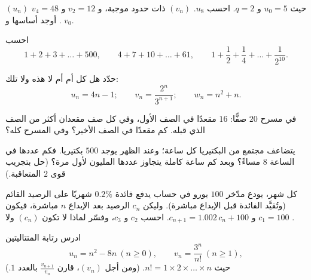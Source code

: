 \begin{exercise}[$\star$]\label{exo:g11:seq:3}
 $(u_n)$  حيث $u_0 = 5$ و $q = 2$. احسب $u_8$.  $(v_n)$
 ذات حدود موجبة، و $v_2 = 12$ و $v_4 = 48$. أوجد أساسها
و $v_0$.
\end{exercise}

\begin{exercise}[$\star$]\label{exo:g11:seq:4}
احسب
\[
1 + 2 + 3 + \dots + 500, \qquad
4 + 7 + 10 + \dots + 61, \qquad
1 + \frac12 + \frac14 + \dots + \frac{1}{2^{10}} .
\]
\end{exercise}

\begin{exercise}[$\star$]\label{exo:g11:seq:5}
حدّد هل كل  أم  أم لا هذه ولا تلك:
\[
u_n = 4n - 1; \qquad
v_n = \frac{2^n}{3^{n+1}}; \qquad
w_n = n^2 + n .
\]
\end{exercise}

\begin{exercise}[$\star\star$]\label{exo:g11:seq:6}
في مسرح $20$ صفًّا: $16$ مقعدًا في الصف الأول، وفي كل صف
مقعدان أكثر من الصف الذي قبله. كم مقعدًا في الصف
الأخير؟ وفي المسرح كله؟
\end{exercise}

\begin{exercise}[$\star\star$]\label{exo:g11:seq:7}
يتضاعف مجتمع من البكتيريا كل ساعة؛ وعند الظهر يوجد $500$
بكتيريا. فكم عددها في الساعة 8 مساءً؟ وبعد كم ساعة كاملة يتجاوز
عددها المليون لأول مرة؟ (حل بتجريب قوى $2$
المتعاقبة.)
\end{exercise}

\begin{exercise}[$\star\star$]\label{exo:g11:seq:8}
كل شهر، يودع مدّخر $100$ يورو في حساب يدفع
فائدة $0.2\%$ شهريًا على الرصيد القائم (وتُقيَّد الفائدة
قبل الإيداع مباشرة). وليكن $c_n$ الرصيد بعد الإيداع
$n$ مباشرة، فيكون $c_1 = 100$ و $c_{n+1} = 1.002\,c_n + 100$. احسب $c_2$
و $c_3$، وفسّر لماذا لا تكون $(c_n)$  ولا .
\end{exercise}

\begin{exercise}[$\star\star$]\label{exo:g11:seq:9}
ادرس رتابة المتتاليتين
\[
u_n = n^2 - 8n \ (n \geq 0), \qquad
v_n = \frac{3^n}{n!}\ (n \geq 1),
\]
حيث $n! = 1 \times 2 \times \dots \times n$. (ومن أجل $(v_n)$، قارن
$\frac{v_{n+1}}{v_n}$ بالعدد $1$.)
\end{exercise}


